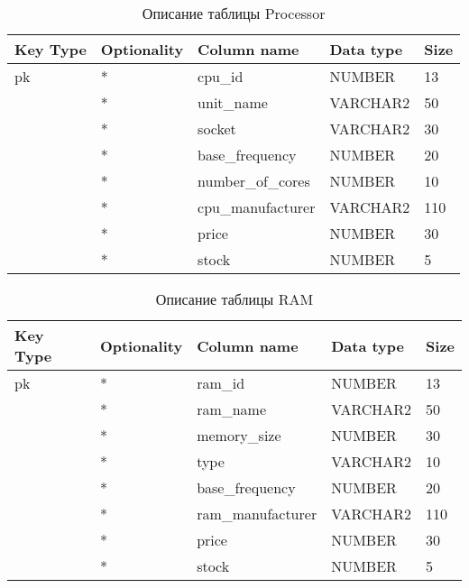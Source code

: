 \begin{xltabular}{\textwidth}{|X|X|p{4.0cm}|X|X|}
	\caption{Описание таблицы Processor\label{tab:processor}}\\
	\hline
	Key Type & Optionality & Column name & Data type & Size \\ \hline
	pk & * & cpu\_id & NUMBER & 13 \\ \hline
	& * & unit\_name & VARCHAR2 & 50 \\ \hline
	& * & socket & VARCHAR2 & 30 \\ \hline
	& * & base\_frequency & NUMBER & 20 \\ \hline
	& * & number\_of\_cores & NUMBER & 10 \\ \hline
	& * & cpu\_manufacturer & VARCHAR2 & 110 \\ \hline
	& * & price & NUMBER & 30 \\ \hline
	& * & stock & NUMBER & 5 \\ \hline
\end{xltabular}

\begin{xltabular}{\textwidth}{|X|X|p{4.0cm}|X|X|}
	\caption{Описание таблицы RAM\label{tab:ram}}\\
	\hline
	Key Type & Optionality & Column name & Data type & Size \\ \hline
	pk & * & ram\_id & NUMBER & 13 \\ \hline
	& * & ram\_name & VARCHAR2 & 50 \\ \hline
	& * & memory\_size & NUMBER & 30 \\ \hline
	& * & type & VARCHAR2 & 10 \\ \hline
	& * & base\_frequency & NUMBER & 20 \\ \hline
	& * & ram\_manufacturer & VARCHAR2 & 110 \\ \hline
	& * & price & NUMBER & 30 \\ \hline
	& * & stock & NUMBER & 5 \\ \hline
\end{xltabular}

